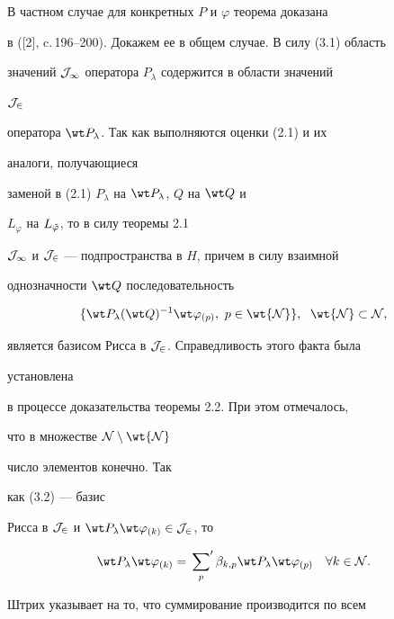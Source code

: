 \begin{pf} 


В частном случае для конкретных $P$ и $\varphi$ теорема доказана 


в ([2], c.\,196--200). Докажем ее в общем случае. В силу (3.1) область 


значений $\cal J_1$ оператора $P_\lambda$ содержится в области значений 


$\cal J_2$ 


оператора $\wt P_\lambda$. Так как выполняются оценки (2.1) и их 


аналоги, получающиеся 


заменой в (2.1) $P_\lambda$ на $\wt P_\lambda$, $Q$ на $\wt Q$ и 


$L_\varphi$ на $L_{\Tilde\varphi}$, то в силу теоремы 2.1\; 


$\cal J_1$ и $\cal J_2$ --- подпространства в $H$, причем в силу взаимной 


однозначности $\wt Q$ последовательность 


\begin{equation} 


\{\wt P_\lambda(\wt Q)^{-1}\wt\varphi_{(p)}, 


\ p\in\wt{\cal N}\},\ \;\wt{\cal N}\subset\cal N,


\end{equation} 


является базисом Рисса в $\cal J_2$. Справедливость этого факта была 


установлена 


в процессе доказательства теоремы 2.2. При этом отмечалось,  


что в множестве $\cal N\setminus\wt{\cal N}$ 


число элементов конечно. Так 


как (3.2) --- базис 


Рисса в $\cal J_2$ и $\wt P_\lambda\wt\varphi_{(k)}\in\cal J_2$, то 


\begin{equation} 


\wt P_\lambda\wt\varphi_{(k)}=\sideset{}{'}\sum_p 


\beta_{k,p}\wt P_\lambda\wt\varphi_{(p)}\quad 


\forall k\in\cal N. 


\end{equation} 


Штрих указывает на то, что суммирование производится по всем 



\end{pf}
